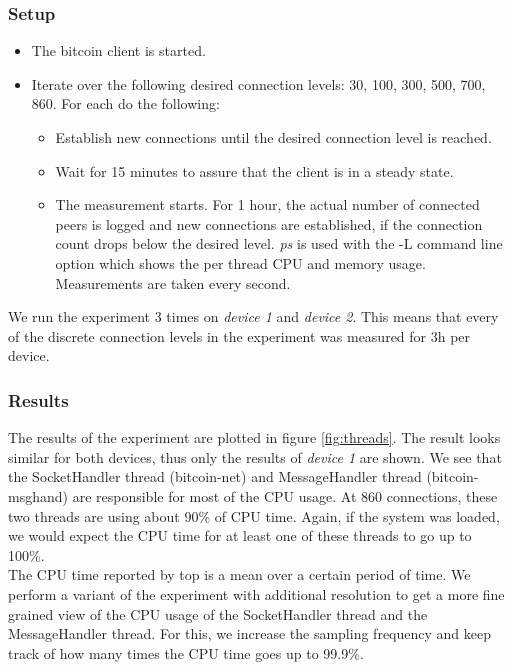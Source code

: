 \subsubsection{Setup}
\begin{itemize}
	\item The bitcoin client is started.
	\item Iterate over the following desired connection levels: 30, 100, 300, 500, 700, 860. For each do the following:
	\begin{itemize}
	\item Establish new connections until the desired connection level is reached.
	\item Wait for 15 minutes to assure that the client is in a steady state.
	\item The measurement starts. For 1 hour, the actual number of connected peers is logged and new connections are established, if the connection count drops below the desired level. \textit{ps} is used with the -L command line option which shows the per thread CPU and memory usage. Measurements are taken every second.
	\end{itemize}
\end{itemize}
We run the experiment 3 times on \textit{device 1} and \textit{device 2}. This means that every of the discrete connection levels in the experiment was measured for 3h per device.\\
\subsubsection{Results}
The results of the experiment are plotted in figure \ref{fig:threads}. The result looks similar for both devices, thus only the results of \textit{device 1} are shown.
We see that the SocketHandler thread (bitcoin-net) and MessageHandler thread (bitcoin-msghand) are responsible for most of the CPU usage. At 860 connections, these two threads are using about 90\% of CPU time. Again, if the system was loaded, we would expect the CPU time for at least one of these threads to go up to 100\%.\\
The CPU time reported by top is a mean over a certain period of time. We perform a variant of the experiment with additional resolution to get a more fine grained view of the CPU usage of the SocketHandler thread and the MessageHandler thread. For this, we increase the sampling frequency and keep track of how many times the CPU time goes up to 99.9\%.
